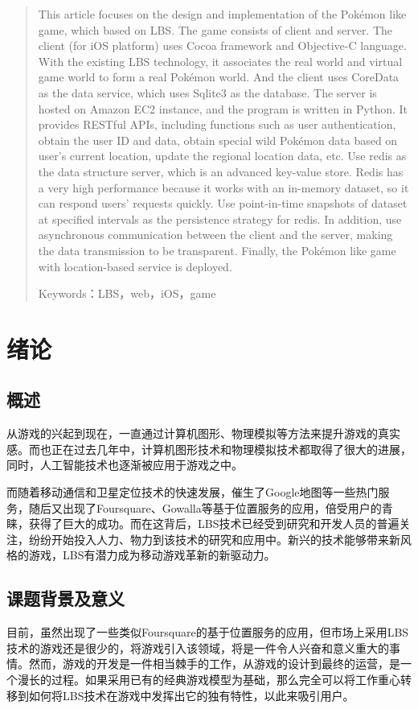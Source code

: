 \documentclass{article}
\begin{document}
\begin{CJK}{UTF8}{gbsn}
\begin{abstract}
    This article focuses on the design and implementation of the Pokémon like game, which based on LBS. The game consists of client and server. The client (for iOS platform) uses Cocoa framework and Objective-C language. With the existing LBS technology, it associates the real world and virtual game world to form a real Pokémon world. And the client uses CoreData as the data service, which uses Sqlite3 as the database. The server is hosted on Amazon EC2 instance, and the program is written in Python. It provides RESTful APIs, including functions such as user authentication, obtain the user ID and data, obtain special wild Pokémon data based on user's current location, update the regional location data, etc. Use redis as the data structure server, which is an advanced key-value store. Redis has a very high performance because it works with an in-memory dataset, so it can respond users' requests quickly. Use point-in-time snapshots of dataset at specified intervals as the persistence strategy for redis. In addition, use asynchronous communication between the client and the server, making the data transmission to be transparent. Finally, the Pokémon like game with location-based service is deployed.

    Keywords：LBS，web，iOS，game
    
  \end{abstract}

  \newpage
  \section{绪论}
	\subsection{概述}
  从游戏的兴起到现在，一直通过计算机图形、物理模拟等方法来提升游戏的真实感。而也正在过去几年中，计算机图形技术和物理模拟技术都取得了很大的进展，同时，人工智能技术也逐渐被应用于游戏之中。

  而随着移动通信和卫星定位技术的快速发展，催生了Google地图等一些热门服务，随后又出现了Foursquare、Gowalla等基于位置服务的应用，倍受用户的青睐，获得了巨大的成功。而在这背后，LBS技术已经受到研究和开发人员的普遍关注，纷纷开始投入人力、物力到该技术的研究和应用中。新兴的技术能够带来新风格的游戏，LBS有潜力成为移动游戏革新的新驱动力。

	\subsection{课题背景及意义}
  目前，虽然出现了一些类似Foursquare的基于位置服务的应用，但市场上采用LBS技术的游戏还是很少的，将游戏引入该领域，将是一件令人兴奋和意义重大的事情。然而，游戏的开发是一件相当棘手的工作，从游戏的设计到最终的运营，是一个漫长的过程。如果采用已有的经典游戏模型为基础，那么完全可以将工作重心转移到如何将LBS技术在游戏中发挥出它的独有特性，以此来吸引用户。


\end{CJK}
\end{document}
